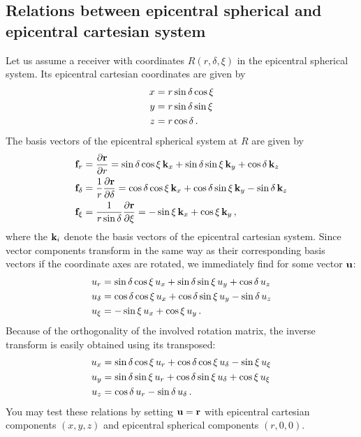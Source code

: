 \documentclass[12pt,a4paper]{article}
\renewcommand{\v}[1]{{\bf #1}}
\begin{document}
\subsection{Relations between epicentral spherical and epicentral cartesian system} 
Let us assume a receiver with coordinates $R(r,\delta,\xi)$ in the epicentral spherical system. Its epicentral cartesian coordinates are given by
\begin{align}
x &= r\sin\delta\cos\xi \notag \\
y &= r\sin\delta\sin\xi \notag \\
z &= r\cos\delta \,.
\end{align}
The basis vectors of the epicentral spherical system at $R$ are given by
\begin{align}
\v{f}_r &= \frac{\partial\v{r}}{\partial r} = \sin\delta\cos\xi\,\v{k}_x + \sin\delta\sin\xi\,\v{k}_y+\cos\delta\,\v{k}_z \notag \\
\v{f}_\delta &= \frac{1}{r}\frac{\partial\v{r}}{\partial\delta} = \cos\delta\cos\xi\,\v{k}_x + \cos\delta\sin\xi\,\v{k}_y -\sin\delta\,\v{k}_z  \notag \\
\v{f}_\xi &= \frac{1}{r\sin\delta}\frac{\partial\v{r}}{\partial\xi} = -\sin\xi\,\v{k}_x + \cos\xi\,\v{k}_y \,,
\end{align}
where the $\v{k}_i$ denote the basis vectors of the epicentral cartesian system.
Since vector components transform in the same way as their corresponding basis vectors if the coordinate axes are rotated, we immediately find for some vector $\v{u}$:
\begin{align}\label{eq:ectoes}
u_r &= \sin\delta\cos\xi\, u_x + \sin\delta\sin\xi\, u_y+\cos\delta\, u_z \notag \\
u_\delta &= \cos\delta\cos\xi\, u_x + \cos\delta\sin\xi\, u_y -\sin\delta\, u_z  \notag \\
u_\xi &= -\sin\xi\, u_x + \cos\xi\, u_y \,.
\end{align}      
Because of the orthogonality of the involved rotation matrix, the inverse transform is easily obtained using its transposed:
\begin{align}\label{eq:estoec}
u_x &= \sin\delta\cos\xi\, u_r + \cos\delta\cos\xi\,u_\delta-\sin\xi\,u_\xi \notag \\
u_y &= \sin\delta\sin\xi\, u_r + \cos\delta\sin\xi\,u_\delta+\cos\xi\,u_\xi  \notag \\
u_z &= \cos\delta\,u_r -\sin\delta\,u_\delta \,.
\end{align}      
You may test these relations by setting $\v{u}=\v{r}$ with epicentral cartesian components $(x,y,z)$ and epicentral spherical components $(r,0,0)$. 
%
\end{document}
